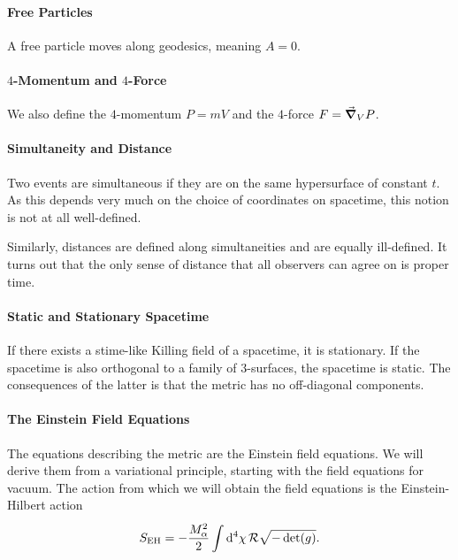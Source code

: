 \paragraph{Free Particles}
A free particle moves along geodesics, meaning $A = 0$.

\paragraph{$4$-Momentum and $4$-Force}
We also define the $4$-momentum $P = mV$ and the $4$-force $F = \grad_{V}{P}$.

\paragraph{Simultaneity and Distance}
Two events are simultaneous if they are on the same hypersurface of constant $t$. As this depends very much on the choice of coordinates on spacetime, this notion is not at all well-defined.

Similarly, distances are defined along simultaneities and are equally ill-defined. It turns out that the only sense of distance that all observers can agree on is proper time.

\paragraph{Static and Stationary Spacetime}
If there exists a stime-like Killing field of a spacetime, it is stationary. If the spacetime is also orthogonal to a family of $3$-surfaces, the spacetime is static. The consequences of the latter is that the metric has no off-diagonal components.

\paragraph{The Einstein Field Equations}
The equations describing the metric are the Einstein field equations. We will derive them from a variational principle, starting with the field equations for vacuum. The action from which we will obtain the field equations is the Einstein-Hilbert action
\begin{align*}
	S_{\text{EH}} = -\frac{M_{\alpha}^{2}}{2}\int\limits_{}^{}\dd[4]{\chi}\mathcal{R}\sqrt{-\det(g)}.
\end{align*}

